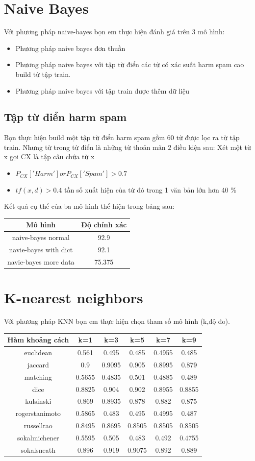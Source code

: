 \documentclass[a4paper,12pt]{report}
\begin{document}
\section{Naive Bayes}
Với phương pháp naive-bayes bọn em thực hiện đánh giá trên 3 mô hình:
\begin{itemize}
\item Phương pháp naive bayes đơn thuần
\item Phương pháp naive bayes với tập từ điển các từ có xác suất harm spam cao build từ tập train.
\item Phương pháp naive bayes với tập train được thêm dữ liệu
\end{itemize}
\subsection{Tập từ điển harm spam}
Bọn thực hiện build một tập từ điển harm spam gồm 60 từ được lọc ra từ tập train. Nhưng từ trong từ điển là những từ thoản mãn 2 điều kiện sau:
Xét một từ x gọi CX là  tập câu chứa từ x
\begin{itemize}
\item $P_{CX}['Harm'] or P_{CX}['Spam'] >0.7$
\item $tf(x,d) >0.4$ tần số xuất hiện của từ đó trong 1 văn bản lớn hơn 40 \%
\end{itemize}
Kết quả cụ thể của ba mô hình thể hiện trong bảng sau:
\begin{longtable}{|c|c|}
\hline 
Mô hình & Độ chính xác \\ \hline
naive-bayes normal & 92.9\\ \hline
navie-bayes with dict & 92.1 \\ \hline
navie-bayes more data & 75.375\\ \hline
\end{longtable}


\section{K-nearest neighbors}
Với phương pháp KNN bọn em thực hiện chọn tham số mô hình (k,độ đo). 
\begin{longtable}{|c|c|c|c|c|c|}
\hline
Hàm khoảng cách & k=1 & k=3 & k=5 & k=7 & k=9\\
\hline
euclidean & 0.561 &0.495 &0.485&0.4955&0.485 \\
\hline 
jaccard & 0.9 & 0.9095 & 0.905 & 0.8995 & 0.879 \\ \hline
matching & 0.5655 & 0.4835 &  0.501 &0.4885 & 0.489 \\ \hline 
dice &0.8825 & 0.904 & 0.902 & 0.8955 & 0.8855 \\ \hline
kulsinski&  0.869 &0.8935& 0.878& 0.882 &0.875 \\ \hline 
rogerstanimoto&  0.5865& 0.483& 0.495 &0.4995& 0.487 \\ \hline
russellrao&  0.8495& 0.8695& 0.8505  &0.8505& 0.8505 \\ \hline 
sokalmichener& 0.5595& 0.505 &0.483 &0.492 &0.4755 \\ \hline 
sokalsneath& 0.896& 0.919  & 0.9075& 0.892 & 0.889 \\ \hline
\end{longtable}
\end{document}
